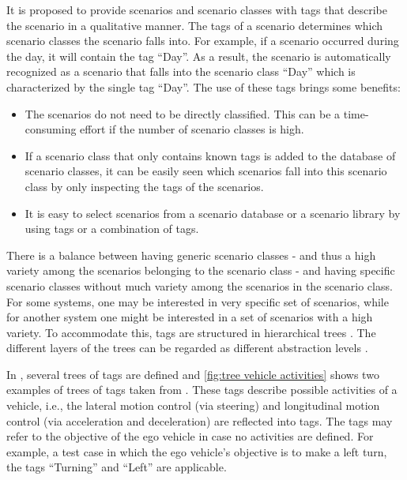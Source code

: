 It is proposed to provide scenarios and scenario classes with tags that describe the scenario in a qualitative manner. The tags of a scenario determines which scenario classes the scenario falls into. For example, if a scenario occurred during the day, it will contain the tag ``Day''. As a result, the scenario is automatically recognized as a scenario that falls into the scenario class ``Day'' which is characterized by the single tag ``Day''. The use of these tags brings some benefits:
\begin{itemize}
	\item The scenarios do not need to be directly classified. This can be a time-consuming effort if the number of scenario classes is high.
	\item If a scenario class that only contains known tags is added to the database of scenario classes, it can be easily seen which scenarios fall into this scenario class by only inspecting the tags of the scenarios.
	\item It is easy to select scenarios from a scenario database or a scenario library by using tags or a combination of tags.
\end{itemize}

There is a balance between having generic scenario classes - and thus a high variety among the scenarios belonging to the scenario class - and having specific scenario classes without much variety among the scenarios in the scenario class. For some systems, one may be interested in very specific set of scenarios, while for another system one might be interested in a set of scenarios with a high variety. To accommodate this, tags are structured in hierarchical trees \cite{molloy2017dynamic, badger2012dynamic}. The different layers of the trees can be regarded as different abstraction levels \cite{Bonnin2014}. 

In \cite{degelder2019scenarioclasses}, several trees of tags are defined and \cref{fig:tree vehicle activities} shows two examples of trees of tags taken from \cite{degelder2019scenarioclasses}. These tags describe possible activities of a vehicle, i.e., the lateral motion control (via steering) and longitudinal motion control (via acceleration and deceleration) are reflected into tags. The tags may refer to the objective of the ego vehicle in case no activities are defined. For example, a test case in which the ego vehicle's objective is to make a left turn, the tags ``Turning'' and ``Left'' are applicable. 

